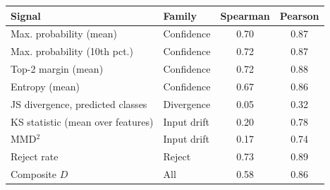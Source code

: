 \begin{tabular}{@{}llcc@{}}
\toprule
Signal & Family & Spearman & Pearson \\
\midrule
Max. probability (mean) & Confidence & 0.70 & 0.87 \\
Max. probability (10th pct.) & Confidence & 0.72 & 0.87 \\
Top-2 margin (mean) & Confidence & 0.72 & 0.88 \\
Entropy (mean) & Confidence & 0.67 & 0.86 \\
JS divergence, predicted classes & Divergence & 0.05 & 0.32 \\
KS statistic (mean over features) & Input drift & 0.20 & 0.78 \\
MMD$^2$ & Input drift & 0.17 & 0.74 \\
Reject rate & Reject & 0.73 & 0.89 \\
\midrule
Composite $D$ & All & 0.58 & 0.86 \\
\bottomrule
\end{tabular}
